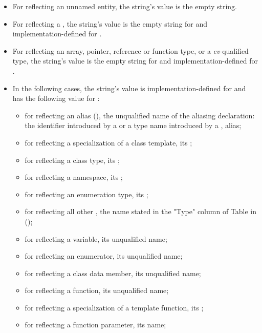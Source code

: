 \begin{std.txt}
\begin{itemdescr}
\begin{itemize}
\item For  reflecting an unnamed entity, the string's value is the empty string.
\item For  reflecting a , the string's value is the empty string for  and implementation-defined for .
\item For  reflecting an array, pointer, reference or function type, or a \emph{cv}-qualified type, the string's value is the empty string for  and implementation-defined for .
\item In the following cases, the string's value is implementation-defined for  and has the following value for :
\begin{itemize}
  \item for  reflecting an alias (), the unqualified name of the aliasing declaration: the identifier introduced by a  or a type name introduced by a , alias;
  \item for  reflecting a specialization of a class template, its ;
  \item for  reflecting a class type, its ;
  \item for  reflecting a namespace, its ;
  \item for  reflecting an enumeration type, its ;
  \item for  reflecting all other , the name stated in the "Type" column of Table  in ();
  \item for  reflecting a variable, its unqualified name;
  \item for  reflecting an enumerator, its unqualified name;
  \item for  reflecting a class data member, its unqualified name;
  \item for  reflecting a function, its unqualified name;
  \item for  reflecting a specialization of a template function, its ;
  \item for  reflecting a function parameter, its name;

\end{itemize}
\end{itemize}
\end{itemdescr}
\end{std.txt}
